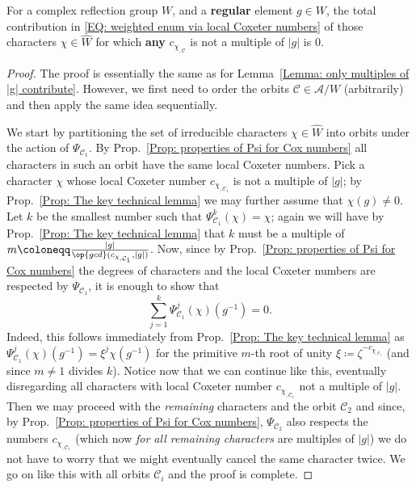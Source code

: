 \begin{lemma}\label{Lemma: weigted enumeration only multiples of |g| contribute}
For a complex reflection group $W$, and a \textbf{regular} element $g\in W$, the total contribution in \eqref{EQ: weighted enum via local Coxeter numbers} of those characters $\chi\in\widehat{W}$ for which \textbf{any} $c_{\chi_{,\mathcal{C}}}$ is not a multiple of $|g|$ is $0$.
\end{lemma}
\begin{proof}
The proof is essentially the same as for Lemma~\ref{Lemma: only multiples of |g| contribute}. However, we first need to order the orbits $\mathcal{C}\in\mathcal{A}/W$ (arbitrarily) and then apply the same idea sequentially. 

We start by partitioning the set of irreducible characters $\chi\in\widehat{W}$ into orbits under the action of $\Psi_{\mathcal{C}_1}$. By Prop.~\ref{Prop: properties of Psi for Cox numbers} all characters in such an orbit have the same local Coxeter numbers. Pick a character $\chi$ whose local Coxeter number $c_{\chi_{,\mathcal{C}_1}}$ is not a multiple of $|g|$; by Prop.~\ref{Prop: The key technical lemma} we may further assume that $\chi(g)\neq 0$. Let $k$ be the smallest number such that $\Psi_{\mathcal{C}_1}^k(\chi)=\chi$; again we will have by Prop.~\ref{Prop: The key technical lemma} that $k$ must be a multiple of $m\coloneqq \frac{|g|}{\op{gcd}(c_{\chi_{,\mathcal{C}_1}},|g|)}$. Now, since by Prop.~\ref{Prop: properties of Psi for Cox numbers} the degrees of characters and the local Coxeter numbers are respected by $\Psi_{\mathcal{C}_1}$, it is enough to show that $$\sum_{j=1}^k\Psi^j_{\mathcal{C}_1}(\chi)(g^{-1})=0.$$ 
Indeed, this follows immediately from Prop.~\ref{Prop: The key technical lemma} as $\Psi_{\mathcal{C}_1}^j(\chi)(g^{-1})=\xi^j\chi(g^{-1})$ for the primitive $m$-th root of unity $\xi\coloneqq \zeta^{-c_{\chi_{,\mathcal{C}_1}}}$ (and since $m\neq 1$ divides $k$). Notice now that we can continue like this, eventually disregarding all characters with local Coxeter number $c_{\chi_{,\mathcal{C}_1}}$ not a multiple of $|g|$. Then we may proceed with the {\it remaining} characters and the orbit $\mathcal{C}_2$ and since, by Prop.~\ref{Prop: properties of Psi for Cox numbers}, $\Psi_{\mathcal{C}_2}$ also respects the numbers $c_{\chi_{,\mathcal{C}_1}}$ (which now \emph{for all remaining characters} are multiples of $|g|$) we do not have to worry that we might eventually cancel the same character twice. We go on like this with all orbits $\mathcal{C}_i$ and the proof is complete.
\end{proof}

